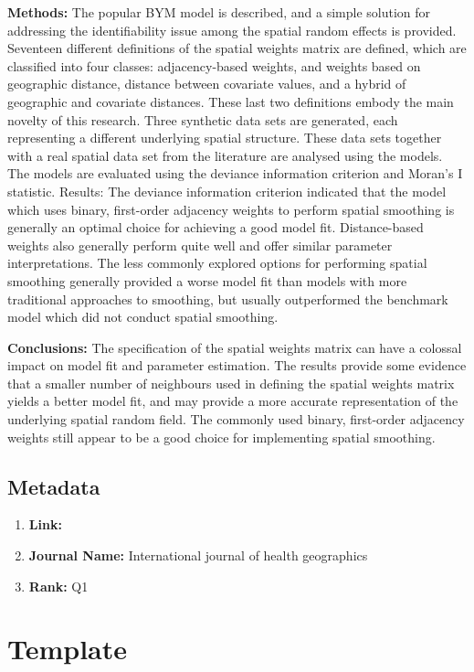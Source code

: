 \documentclass[10pt, oneside]{article}
\begin{document}
\textbf{Methods:} The popular BYM model is described, and a simple solution for addressing the identifiability issue among
the spatial random effects is provided. Seventeen different definitions of the spatial weights matrix are defined,
which are classified into four classes: adjacency-based weights, and weights based on geographic distance, distance
between covariate values, and a hybrid of geographic and covariate distances. These last two definitions embody the
main novelty of this research. Three synthetic data sets are generated, each representing a different underlying spatial
structure. These data sets together with a real spatial data set from the literature are analysed using the models. The
models are evaluated using the deviance information criterion and Moran’s I statistic.
Results: The deviance information criterion indicated that the model which uses binary, first-order adjacency
weights to perform spatial smoothing is generally an optimal choice for achieving a good model fit. Distance-based
weights also generally perform quite well and offer similar parameter interpretations. The less commonly explored
options for performing spatial smoothing generally provided a worse model fit than models with more traditional
approaches to smoothing, but usually outperformed the benchmark model which did not conduct spatial
smoothing.

\textbf{Conclusions:} The specification of the spatial weights matrix can have a colossal impact on model fit and parameter
estimation. The results provide some evidence that a smaller number of neighbours used in defining the spatial
weights matrix yields a better model fit, and may provide a more accurate representation of the underlying spatial
random field. The commonly used binary, first-order adjacency weights still appear to be a good choice for implementing
spatial smoothing.
\cite{duncan2017spatial}

\subsection*{Metadata}
\begin{enumerate}
	\item \textbf{Link:}
	\item \textbf{Journal Name:} International journal of health geographics
	\item \textbf{Rank:} Q1
\end{enumerate}


\section*{Template}
\end{document}
